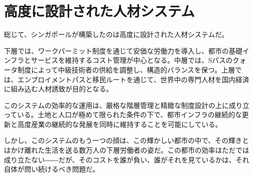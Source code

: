\section{高度に設計された人材システム}

総じて、シンガポールが構築したのは高度に設計された人材システムだ。

下層では、ワークパーミット制度を通じて安価な労働力を導入し、都市の基礎インフラとサービスを維持するコスト管理が中心となる。中層では、Sパスのクォータ制度によって中級技術者の供給を調整し、構造的バランスを保つ。上層では、エンプロイメントパスと移民ルートを通じて、世界中の専門人材を国内経済に組み込む人材誘致が目的となる。

このシステムの効率的な運用は、厳格な階層管理と精緻な制度設計の上に成り立っている。土地と人口が極めて限られた条件の下で、都市インフラの継続的な更新と高度産業の継続的な発展を同時に維持することを可能にしている。

しかし、このシステムのもう一つの顔は、この輝かしい都市の中で、その輝きとはかけ離れた生活を送る数万人の下層労働者の姿だ。この都市の効率はただでは成り立たない――だが、そのコストを誰が負い、誰がそれを見ているかは、それ自体が問い続けるべき問題だ。
